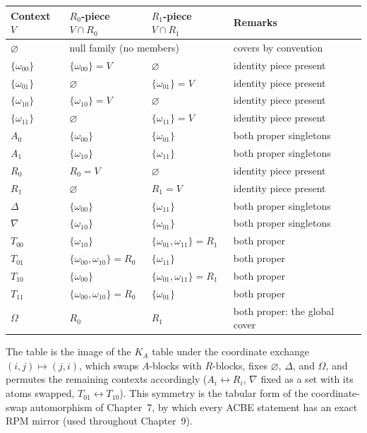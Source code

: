 \begin{longtable}{@{}llll@{}}
\toprule
Context $V$ & $R_0$-piece $V \cap R_0$ & $R_1$-piece $V \cap R_1$ &
Remarks \\
\midrule
\endhead
\bottomrule
\endfoot
$\varnothing$ & \multicolumn{2}{l}{null family (no members)} &
covers by convention \\
$\{\omega_{00}\}$ & $\{\omega_{00}\} = V$ & $\varnothing$ &
identity piece present \\
$\{\omega_{01}\}$ & $\varnothing$ & $\{\omega_{01}\} = V$ &
identity piece present \\
$\{\omega_{10}\}$ & $\{\omega_{10}\} = V$ & $\varnothing$ &
identity piece present \\
$\{\omega_{11}\}$ & $\varnothing$ & $\{\omega_{11}\} = V$ &
identity piece present \\
$A_0$ & $\{\omega_{00}\}$ & $\{\omega_{01}\}$ & both proper singletons \\
$A_1$ & $\{\omega_{10}\}$ & $\{\omega_{11}\}$ & both proper singletons \\
$R_0$ & $R_0 = V$ & $\varnothing$ & identity piece present \\
$R_1$ & $\varnothing$ & $R_1 = V$ & identity piece present \\
$\Delta$ & $\{\omega_{00}\}$ & $\{\omega_{11}\}$ & both proper singletons \\
$\nabla$ & $\{\omega_{10}\}$ & $\{\omega_{01}\}$ & both proper singletons \\
$T_{00}$ & $\{\omega_{10}\}$ & $\{\omega_{01}, \omega_{11}\} = R_1$ &
both proper \\
$T_{01}$ & $\{\omega_{00}, \omega_{10}\} = R_0$ & $\{\omega_{11}\}$ &
both proper \\
$T_{10}$ & $\{\omega_{00}\}$ & $\{\omega_{01}, \omega_{11}\} = R_1$ &
both proper \\
$T_{11}$ & $\{\omega_{00}, \omega_{10}\} = R_0$ & $\{\omega_{01}\}$ &
both proper \\
$\Omega$ & $R_0$ & $R_1$ & both proper: the global cover \\
\end{longtable}

The table is the image of the $K_A$ table under the coordinate exchange
$(i, j) \mapsto (j, i)$, which swaps $A$-blocks with $R$-blocks, fixes
$\varnothing$, $\Delta$, and $\Omega$, and permutes the remaining contexts
accordingly ($A_i \leftrightarrow R_i$, $\nabla$ fixed as a set with its
atoms swapped, $T_{01} \leftrightarrow T_{10}$). This symmetry is the
tabular form of the coordinate-swap automorphism of Chapter~7, by which
every ACBE statement has an exact RPM mirror (used throughout
Chapter~9).


